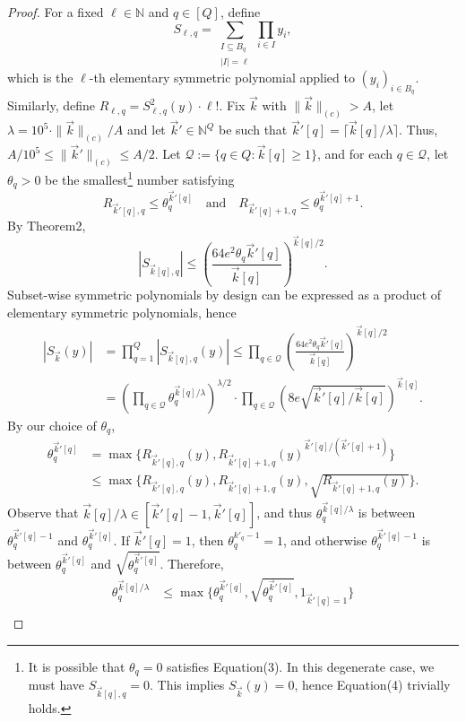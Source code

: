 \begin{proof}
For a fixed $\ell\in\mathbb N$ and $q\in[Q]$, define
\[
S_{\ell,q}=\sum_{\substack{I\subseteq B_q\\|I|=\ell}}\prod_{i\in I}y_i,
\]
which is the $\ell$-th elementary symmetric polynomial applied to $(y_i)_{i\in B_q}$. Similarly, define $R_{\ell,q}=S_{\ell,q}^2(y)\cdot\ell!$.
Fix $\vec k$ with $\|\vec k\|_{(c)}>A$, let $\lambda=10^5\cdot\|\vec k\|_{(c)}/A$ and let $\vec k'\in\mathbb N^Q$ be such that $\vec k'[q]=\lceil\vec k[q]/\lambda\rceil$. Thus, $A/10^5\le\|\vec k'\|_{(c)}\le A/2$. Let $\mathcal Q:=\{q\in Q:\vec k[q]\ge1\}$, and for each $q\in\mathcal Q$, let $\theta_q>0$ be the smallest\footnote{It is possible that $\theta_q=0$ satisfies Equation(3). In this degenerate case, we must have $S_{\vec k[q],q}=0$. This implies $S_{\vec k}(y)=0$, hence Equation(4) trivially holds.} number satisfying
\begin{equation}
R_{\vec k'[q],q}\le\theta_q^{\vec k'[q]}
\quad\text{and}\quad
R_{\vec k'[q]+1,q}\le\theta_q^{\vec k'[q]+1}.\tag{3}
\end{equation}
By Theorem2,
\[
|S_{\vec k[q],q}|\le\left(\frac{64e^2\theta_q\vec k'[q]}{\vec k[q]}\right)^{\vec k[q]/2}.
\]
Subset-wise symmetric polynomials by design can be expressed as a product of elementary symmetric polynomials, hence
\begin{align*}
|S_{\vec k}(y)|&=\prod_{q=1}^Q|S_{\vec k[q],q}(y)|
\le\prod_{q\in\mathcal Q}\left(\frac{64e^2\theta_q\vec k'[q]}{\vec k[q]}\right)^{\vec k[q]/2}\\
&=\left(\prod_{q\in\mathcal Q}\theta_q^{\vec k[q]/\lambda}\right)^{\lambda/2}
\cdot\prod_{q\in\mathcal Q}\left(8e\sqrt{\vec k'[q]/\vec k[q]}\right)^{\vec k[q]}.
\end{align*}
By our choice of $\theta_q$,
\begin{align*}
\theta_q^{\vec k'[q]}
&=\max\{R_{\vec k'[q],q}(y),R_{\vec k'[q]+1,q}(y)^{\vec k'[q]/(\vec k'[q]+1)}\}\\
&\le\max\{R_{\vec k'[q],q}(y),R_{\vec k'[q]+1,q}(y),\sqrt{R_{\vec k'[q]+1,q}(y)}\}.
\end{align*}
Observe that $\vec k[q]/\lambda\in[\vec k'[q]-1,\vec k'[q]]$, and thus $\theta_q^{\vec k[q]/\lambda}$ is between $\theta_q^{\vec k'[q]-1}$ and $\theta_q^{\vec k'[q]}$. If $\vec k'[q]=1$, then $\theta_q^{k'_q-1}=1$, and otherwise $\theta_q^{\vec k'[q]-1}$ is between $\theta_q^{\vec k'[q]}$ and $\sqrt{\theta_q^{\vec k'[q]}}$. Therefore,
\begin{align*}
\theta_q^{\vec k[q]/\lambda}
&\le\max\{\theta_q^{\vec k'[q]},\sqrt{\theta_q^{\vec k'[q]}},1_{\vec k'[q]=1}\}\\

\end{align*}
\end{proof}

